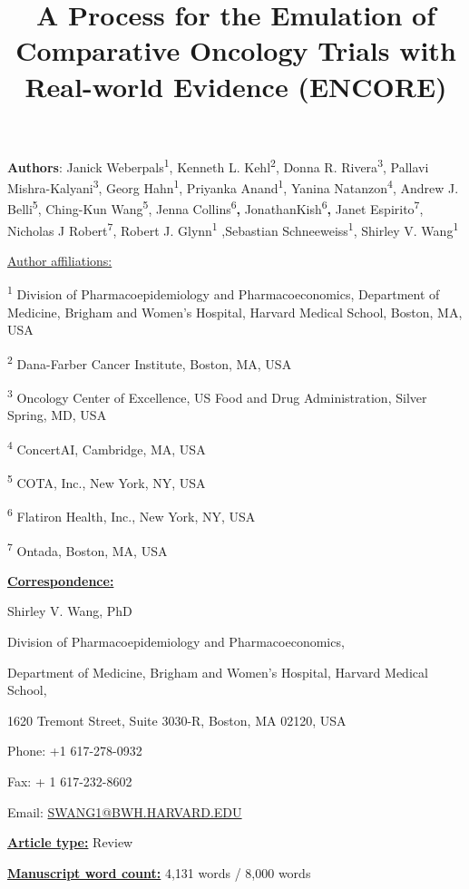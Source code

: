 \documentclass[
  letterpaper,
  DIV=11,
  numbers=noendperiod]{scrartcl}
\title{A Process for the Emulation of Comparative Oncology Trials with
Real-world Evidence (ENCORE)}
\author{}
\date{}
\begin{document}
\maketitle


\textbf{Authors}: Janick Weberpals\textsuperscript{1}, Kenneth L.
Kehl\textsuperscript{2}, Donna R. Rivera\textsuperscript{3}, Pallavi
Mishra-Kalyani\textsuperscript{3}, Georg Hahn\textsuperscript{1},
Priyanka Anand\textsuperscript{1}, Yanina Natanzon\textsuperscript{4},
Andrew J. Belli\textsuperscript{5}, Ching-Kun Wang\textsuperscript{5},
Jenna Collins\textsuperscript{6}\textbf{,}
JonathanKish\textsuperscript{6}\textbf{,} Janet
Espirito\textsuperscript{7}, Nicholas J Robert\textsuperscript{7},
Robert J. Glynn\textsuperscript{1} ,Sebastian
Schneeweiss\textsuperscript{1}, Shirley V. Wang\textsuperscript{1}

\ul{Author affiliations:}

\textsuperscript{1} Division of Pharmacoepidemiology and
Pharmacoeconomics, Department of Medicine, Brigham and Women's Hospital,
Harvard Medical School, Boston, MA, USA

\textsuperscript{2} Dana-Farber Cancer Institute, Boston, MA, USA

\textsuperscript{3} Oncology Center of Excellence, US Food and Drug
Administration, Silver Spring, MD, USA

\textsuperscript{4} ConcertAI, Cambridge, MA, USA

\textsuperscript{5} COTA, Inc., New York, NY, USA

\textsuperscript{6} Flatiron Health, Inc., New York, NY, USA

\textsuperscript{7} Ontada, Boston, MA, USA

\ul{\textbf{Correspondence:}}

Shirley V. Wang, PhD

Division of Pharmacoepidemiology and Pharmacoeconomics,

Department of Medicine, Brigham and Women's Hospital, Harvard Medical
School,

1620 Tremont Street, Suite 3030-R, Boston, MA 02120, USA

Phone: +1 617-278-0932

Fax: + 1 617-232-8602

Email: \url{SWANG1@BWH.HARVARD.EDU}

\ul{\textbf{Article type:}} Review

\ul{\textbf{Manuscript word count:}} 4,131 words / 8,000 words
\end{document}

